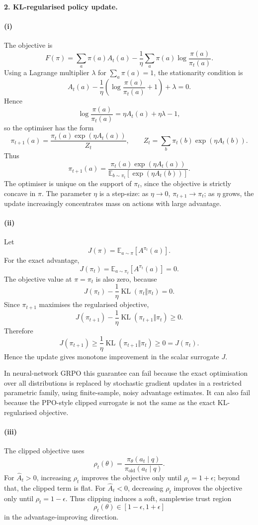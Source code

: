 \paragraph{2. KL-regularised policy update.}

\paragraph{(i)}
The objective is
\[
F(\pi)
=
\sum_a \pi(a)A_t(a)
-
\frac{1}{\eta}\sum_a \pi(a)\log\frac{\pi(a)}{\pi_t(a)}.
\]
Using a Lagrange multiplier \(\lambda\) for \(\sum_a \pi(a)=1\), the stationarity
condition is
\[
A_t(a)
-
\frac{1}{\eta}
\left(
\log\frac{\pi(a)}{\pi_t(a)}+1
\right)
+
\lambda
=
0.
\]
Hence
\[
\log\frac{\pi(a)}{\pi_t(a)}
=
\eta A_t(a)+\eta\lambda-1,
\]
so the optimiser has the form
\[
\pi_{t+1}(a)
=
\frac{\pi_t(a)\exp(\eta A_t(a))}{Z_t},
\qquad
Z_t
=
\sum_b \pi_t(b)\exp(\eta A_t(b)).
\]
Thus
\[
\boxed{
\pi_{t+1}(a)
=
\frac{\pi_t(a)\exp(\eta A_t(a))}
{\mathbb E_{b\sim\pi_t}[\exp(\eta A_t(b))]} .
}
\]
The optimiser is unique on the support of \(\pi_t\), since the objective is
strictly concave in \(\pi\). The parameter \(\eta\) is a step-size: as
\(\eta\to 0\), \(\pi_{t+1}\to \pi_t\); as \(\eta\) grows, the update increasingly
concentrates mass on actions with large advantage.

\paragraph{(ii)}
Let
\[
J(\pi)=\mathbb E_{a\sim\pi}[A^{\pi_t}(a)].
\]
For the exact advantage,
\[
J(\pi_t)
=
\mathbb E_{a\sim\pi_t}[A^{\pi_t}(a)]
=
0.
\]
The objective value at \(\pi=\pi_t\) is also zero, because
\[
J(\pi_t)-\frac{1}{\eta}\operatorname{KL}(\pi_t\Vert\pi_t)=0.
\]
Since \(\pi_{t+1}\) maximises the regularised objective,
\[
J(\pi_{t+1})
-
\frac{1}{\eta}\operatorname{KL}(\pi_{t+1}\Vert\pi_t)
\geq
0.
\]
Therefore
\[
J(\pi_{t+1})
\geq
\frac{1}{\eta}\operatorname{KL}(\pi_{t+1}\Vert\pi_t)
\geq
0
=
J(\pi_t).
\]
Hence the update gives monotone improvement in the scalar surrogate \(J\).

In neural-network GRPO this guarantee can fail because the exact optimisation
over all distributions is replaced by stochastic gradient updates in a restricted
parametric family, using finite-sample, noisy advantage estimates. It can also
fail because the PPO-style clipped surrogate is not the same as the exact
KL-regularised objective.

\paragraph{(iii)}
The clipped objective uses
\[
\rho_t(\theta)
=
\frac{\pi_\theta(a_t\mid q)}{\pi_{\mathrm{old}}(a_t\mid q)}.
\]
For \(\hat A_t>0\), increasing \(\rho_t\) improves the objective only until
\(\rho_t=1+\epsilon\); beyond that, the clipped term is flat. For
\(\hat A_t<0\), decreasing \(\rho_t\) improves the objective only until
\(\rho_t=1-\epsilon\). Thus clipping induces a soft, samplewise trust region
\[
\rho_t(\theta)\in[1-\epsilon,1+\epsilon]
\]
in the advantage-improving direction.

